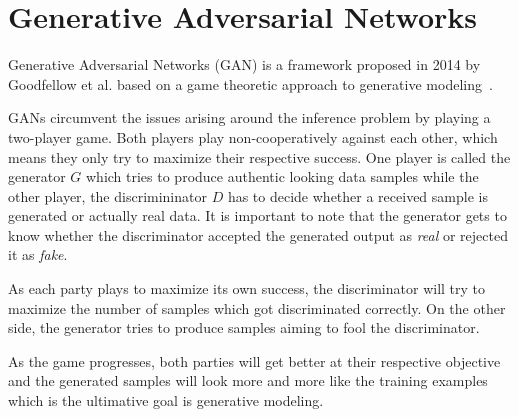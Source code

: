 \section{Generative Adversarial Networks}
\label{sec:gan}

Generative Adversarial Networks (GAN) is a framework proposed in 2014 by Goodfellow et al. \cite{gan:2014} based on a game theoretic approach to generative modeling~\cite[Chapter~20.10.4]{deeplearning:2016}.

GANs circumvent the issues arising around the inference problem by playing a two-player game. Both players play non-cooperatively against each other, which means they only try to maximize their respective success.
One player is called the generator $G$ which tries to produce authentic looking data samples while the other player, the discrimininator $D$ has to decide whether a received sample is generated or actually real data.
It is important to note that the generator gets to know whether the discriminator accepted the generated output as \emph{real} or rejected it as \emph{fake}.

As each party plays to maximize its own success, the discriminator will try to maximize the number of samples which got discriminated correctly.
On the other side, the generator tries to produce samples aiming to fool the discriminator.

As the game progresses, both parties will get better at their respective objective and the generated samples will look more and more like the training examples which is the ultimative goal is generative modeling.\\



